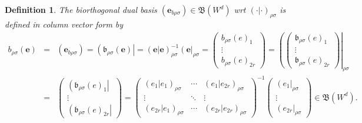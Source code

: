 \documentclass[aps,preprint]{revtex4}
\newtheorem{definition}[theorem]{Definition}
\begin{document}
\begin{definition}
The \emph{biorthogonal dual basis} $\left( \boldsymbol{e}_{b\rho \sigma
}\right) \in \mathfrak{B}\left( W^{d}\right) $ wrt $\left( \left. 
\boldsymbol{\cdot }\right\vert \boldsymbol{\cdot }\right) _{\rho \sigma }$
is defined in column vector form by%
\begin{eqnarray}
b_{\rho \sigma }\left( \boldsymbol{e}\right) &=&\left( \boldsymbol{e}_{b\rho
\sigma }\right) =\left( \mathfrak{b}_{\rho \sigma }\left( \boldsymbol{e}%
\right) \right\vert =\left( \left. \boldsymbol{e}\right\vert \boldsymbol{e}%
\right) _{\rho \sigma }^{-1}\left( \boldsymbol{e}\right\vert _{\rho \sigma
}=\left( 
\begin{array}{c}
b_{\rho \sigma }\left( e\right) _{1} \\ 
\vdots \\ 
b_{\rho \sigma }\left( e\right) _{2r}%
\end{array}%
\right) =\left( \left( 
\begin{array}{c}
\mathfrak{b}_{\rho \sigma }\left( e\right) _{1} \\ 
\vdots \\ 
\mathfrak{b}_{\rho \sigma }\left( e\right) _{2r}%
\end{array}%
\right) \right\vert _{\rho \sigma } \\
&=&\left( 
\begin{array}{c}
\left( \mathfrak{b}_{\rho \sigma }\left( e\right) _{1}\right\vert \\ 
\vdots \\ 
\left( \mathfrak{b}_{\rho \sigma }\left( e\right) _{2r}\right\vert%
\end{array}%
\right) =\left( 
\begin{array}{ccc}
\left( \left. e_{1}\right\vert e_{1}\right) _{\rho \sigma } & \cdots & 
\left( \left. e_{1}\right\vert e_{2r}\right) _{\rho \sigma } \\ 
\vdots & \ddots & \vdots \\ 
\left( \left. e_{2r}\right\vert e_{1}\right) _{\rho \sigma } & \cdots & 
\left( \left. e_{2r}\right\vert e_{2r}\right) _{\rho \sigma }%
\end{array}%
\right) ^{-1}\left( 
\begin{array}{c}
\left( e_{1}\right\vert _{\rho \sigma } \\ 
\vdots \\ 
\left( e_{2r}\right\vert _{\rho \sigma }%
\end{array}%
\right) \in \mathfrak{B}\left( W^{d}\right) .
\end{eqnarray}
\end{definition}
\end{document}

